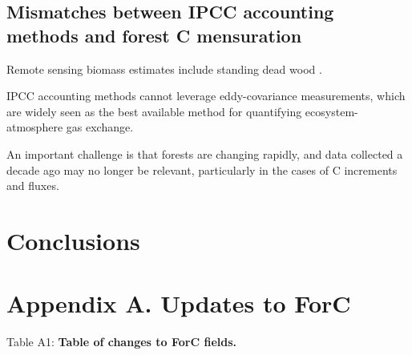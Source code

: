 \documentclass[, manuscript]{copernicus}
\begin{document}
\subsection{Mismatches between IPCC accounting methods and forest C
mensuration}

Remote sensing biomass estimates include standing dead wood
\citep{duncanson_aboveground_2021}.

IPCC accounting methods cannot leverage eddy-covariance measurements,
which are widely seen as the best available method for quantifying
ecosystem-atmosphere gas exchange.

An important challenge is that forests are changing rapidly, and data
collected a decade ago may no longer be relevant, particularly in the
cases of C increments and fluxes.

\section{Conclusions}

\clearpage

\section*{Appendix A. Updates to ForC}

\captionsetup[table]{labelformat=empty}

Table A1: \textbf{Table of changes to ForC fields.}
\end{document}
